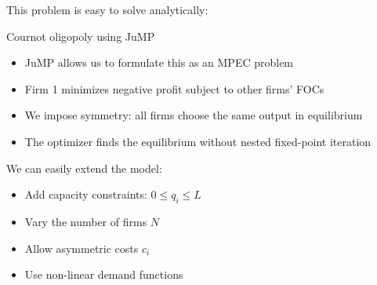 \documentclass[aspectratio=169]{beamer}
\begin{document}
\begin{frame}

This problem is easy to solve analytically:

\bigskip{}


\end{frame}

\begin{frame}

Cournot oligopoly using JuMP

\bigskip{}

\begin{itemize}
\itemsep1.5em
\item<2-> JuMP allows us to formulate this as an MPEC problem
\item<3-> Firm 1 minimizes negative profit subject to other firms' FOCs
\item<4-> We impose symmetry: all firms choose the same output in equilibrium
\item<5-> The optimizer finds the equilibrium without nested fixed-point iteration
\end{itemize}

\end{frame}


\begin{frame}

We can easily extend the model:

\bigskip{}

\begin{itemize}
\itemsep1.5em
\item<2-> Add capacity constraints: $0 \leq q_i \leq L$
\item<3-> Vary the number of firms $N$
\item<4-> Allow asymmetric costs $c_i$
\item<5-> Use non-linear demand functions
\end{itemize}

\end{frame}
\end{document}
